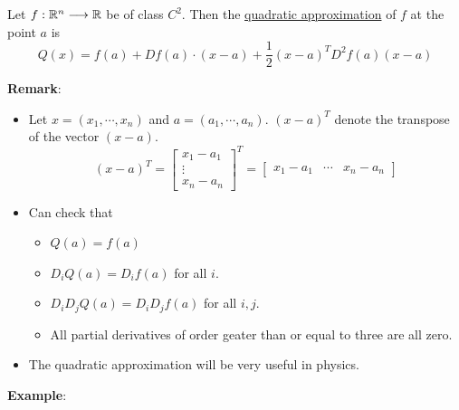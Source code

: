 \begin{definition}
    Let $f:\mathbb{R}^n\longrightarrow \mathbb{R}$ be of class $C^2$. Then the \underline{quadratic approximation} of $f$ at the point $a$ is 
    $$Q(x)=f(a)+Df(a)\cdot(x-a)+\frac{1}{2}(x-a)^TD^2f(a)(x-a)$$
\end{definition}
\noindent \textbf{Remark}:
\begin{itemize}
    \item Let $x=(x_1,\cdots,x_n)$ and $a=(a_1,\cdots,a_n)$. $(x-a)^T$ denote the transpose of the vector $(x-a)$.
    $$(x-a)^T=\begin{bmatrix}
        x_1-a_1\\
        \vdots\\
        x_n-a_n
    \end{bmatrix}^T=\begin{bmatrix}
        x_1-a_1 & \cdots & x_n-a_n
    \end{bmatrix}$$
    \item Can check that
    \begin{itemize}
        \item $Q(a)=f(a)$
        \item $D_iQ(a)=D_if(a)$ for all $i$.
        \item $D_iD_jQ(a)=D_iD_jf(a)$ for all $i,j$.
        \item All partial derivatives of order geater than or equal to three are all zero.
    \end{itemize}
    \item The quadratic approximation will be very useful in physics.
\end{itemize}
\noindent \textbf{Example}:
